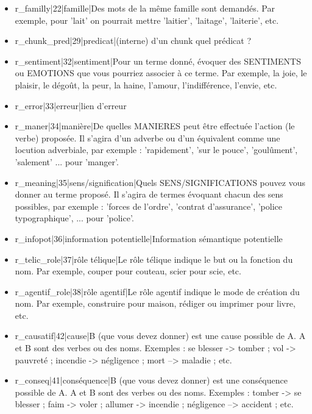 \documentclass[a4paper,11pt,french]{article}
\begin{document}
\begin{itemize}
\item r\_familly|22|famille|Des mots de la même famille sont demandés. Par exemple, pour 'lait' on pourrait mettre 'laitier', 'laitage', 'laiterie', etc.

\item r\_chunk\_pred|29|predicat|(interne) d'un chunk quel prédicat ?

\item r\_sentiment|32|sentiment|Pour un terme donné, évoquer des SENTIMENTS ou EMOTIONS que vous pourriez associer à ce terme. Par exemple, la joie, le plaisir, le dégoût, la peur, la haine, l'amour, l'indifférence, l'envie, etc.

\item r\_error|33|erreur|lien d'erreur

\item r\_maner|34|manière|De quelles MANIERES peut être effectuée l'action (le verbe) proposée. Il s'agira d'un adverbe ou d'un équivalent comme une locution adverbiale, par exemple : 'rapidement', 'sur le pouce', 'goulûment', 'salement' ... pour 'manger'.

\item r\_meaning|35|sens/signification|Quels SENS/SIGNIFICATIONS pouvez vous donner au terme proposé. Il s'agira de termes évoquant chacun des sens possibles, par exemple : 'forces de l'ordre', 'contrat d'assurance', 'police typographique', ... pour 'police'.

\item r\_infopot|36|information potentielle|Information sémantique potentielle

\item r\_telic\_role|37|rôle télique|Le rôle télique indique le but ou la fonction du nom. Par exemple, couper pour couteau, scier pour scie, etc.

\item r\_agentif\_role|38|rôle agentif|Le rôle agentif indique le mode de création du nom. Par exemple, construire pour maison, rédiger ou imprimer pour livre, etc.

\item r\_causatif|42|cause|B (que vous devez donner) est une cause possible de A. A et B sont des verbes ou des noms.  Exemples : se blesser -> tomber ; vol -> pauvreté ; incendie -> négligence ; mort --> maladie ; etc.

\item r\_conseq|41|conséquence|B (que vous devez donner) est une conséquence possible de A. A et B sont des verbes ou des noms.  Exemples : tomber -> se blesser ; faim -> voler ; allumer -> incendie ; négligence --> accident ; etc.


\end{itemize}
\end{document}
